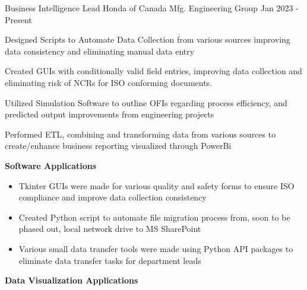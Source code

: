 

\begin{cventries}
  \cventry
    {Business Intelligence Lead} %
    {Honda of Canada Mfg.} %
    {Engineering Group} %
    {Jan 2023 - Present} %
    {
      \begin{cvitems} %
        \item Designed Scripts to Automate Data Collection from various sources improving data consistency and eliminating manual data entry
        \item Created GUIs with conditionally valid field entries, improving data collection and eliminating risk of NCRs for ISO conforming documents.
        \item Utilized Simulation Software to outline OFIs regarding process efficiency, and predicted output improvements from engineering projects
        \item Performed ETL, combining and transforming data from various sources to create/enhance business reporting visualized through PowerBi
        \vspace{0.05cm}
        \item \textbf{Software Applications}
        \vspace{0.05cm}
        \begin{itemize}
            \item Tkinter GUIs were made for various quality and safety forms to ensure ISO compliance and improve data collection consistency 
            \item Created Python script to automate file migration process from, soon to be phased out, local network drive to MS SharePoint
            \item Various small data transfer tools were made using Python API packages to eliminate data transfer tasks for department leads 
        \end{itemize}
        \item \textbf{Data Visualization Applications}

\end{cvitems}}
\end{cventries}
